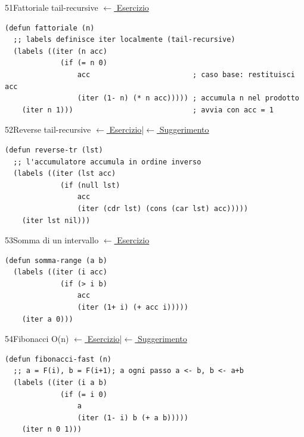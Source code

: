 
\label{sol:51}
\begin{solbox}{51}{Fattoriale tail-recursive}
\small\color{black!55}\hyperref[ex:51]{$\leftarrow$ Esercizio}\normalsize\color{black}
\begin{lstlisting}
(defun fattoriale (n)
  ;; labels definisce iter localmente (tail-recursive)
  (labels ((iter (n acc)
             (if (= n 0)
                 acc                        ; caso base: restituisci acc
                 (iter (1- n) (* n acc))))) ; accumula n nel prodotto
    (iter n 1)))                            ; avvia con acc = 1
\end{lstlisting}
\end{solbox}

\label{sol:52}
\begin{solbox}{52}{Reverse tail-recursive}
\small\color{black!55}\hyperref[ex:52]{$\leftarrow$ Esercizio}\enspace\textcolor{black!30}{|}\enspace\hyperref[hint:52]{$\leftarrow$ Suggerimento}\normalsize\color{black}
\begin{lstlisting}
(defun reverse-tr (lst)
  ;; l'accumulatore accumula in ordine inverso
  (labels ((iter (lst acc)
             (if (null lst)
                 acc
                 (iter (cdr lst) (cons (car lst) acc)))))
    (iter lst nil)))
\end{lstlisting}
\end{solbox}

\label{sol:53}
\begin{solbox}{53}{Somma di un intervallo}
\small\color{black!55}\hyperref[ex:53]{$\leftarrow$ Esercizio}\normalsize\color{black}
\begin{lstlisting}
(defun somma-range (a b)
  (labels ((iter (i acc)
             (if (> i b)
                 acc
                 (iter (1+ i) (+ acc i)))))
    (iter a 0)))
\end{lstlisting}
\end{solbox}

\label{sol:54}
\begin{solbox}{54}{Fibonacci O(n)}
\small\color{black!55}\hyperref[ex:54]{$\leftarrow$ Esercizio}\enspace\textcolor{black!30}{|}\enspace\hyperref[hint:54]{$\leftarrow$ Suggerimento}\normalsize\color{black}
\begin{lstlisting}
(defun fibonacci-fast (n)
  ;; a = F(i), b = F(i+1); a ogni passo a <- b, b <- a+b
  (labels ((iter (i a b)
             (if (= i 0)
                 a
                 (iter (1- i) b (+ a b)))))
    (iter n 0 1)))
\end{lstlisting}
\end{solbox}

